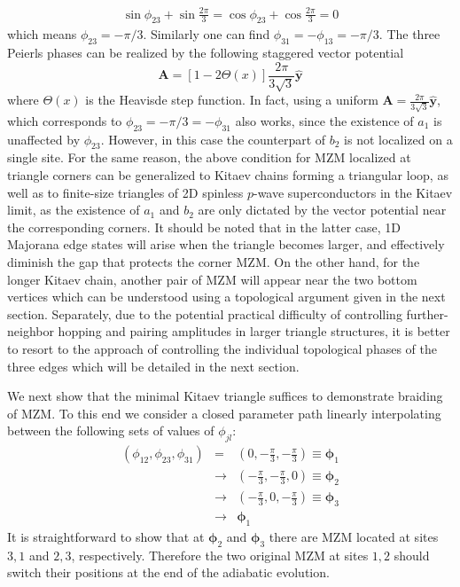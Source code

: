 \documentclass[aps,prb,twocolumn,showpacs,amsmath,amssymb,superscriptaddress]{revtex4-2}
\let\oldhat\hat
\renewcommand{\hat}[1]{\oldhat{\mathbf{#1}}}
\renewcommand{\vec}[1]{\mathbf{#1}}
\begin{document}
\begin{eqnarray}
    \sin\phi_{23} + \sin\frac{2\pi}{3} =\cos\phi_{23} + \cos\frac{2\pi}{3} = 0
\end{eqnarray}
which means $\phi_{23} = -\pi/3$. Similarly one can find $\phi_{31} =-\phi_{13} = -\pi/3$. The three Peierls phases can be realized by the following staggered vector potential
\begin{equation}\label{eq:Astep}
  \vec{A} =\left[1-2\Theta(x)\right]\frac{2 \pi}{3\sqrt{3}} \hat{y}
\end{equation}
where $\Theta(x)$ is the Heavisde step function. In fact, using a uniform $\vec{A} =\frac{2 \pi}{3\sqrt{3}} \hat{y}$, which corresponds to $\phi_{23} = -\pi/3 = -\phi_{31}$ also works, since the existence of $a_1$ is unaffected by $\phi_{23}$. However, in this case the counterpart of $b_2$ is not localized on a single site. For the same reason, the above condition for MZM localized at triangle corners can be generalized to Kitaev chains forming a triangular loop, as well as to finite-size triangles of 2D spinless $p$-wave superconductors in the Kitaev limit, as the existence of $a_1$ and $b_2$ are only dictated by the vector potential near the corresponding corners. It should be noted that in the latter case, 1D Majorana edge states will arise when the triangle becomes larger, and effectively diminish the gap that protects the corner MZM.  On the other hand, for the longer Kitaev chain, another pair of MZM will appear near the two bottom vertices which can be understood using a topological argument given in the next section. Separately, due to the potential practical difficulty of controlling further-neighbor hopping and pairing amplitudes in larger triangle structures, it is better to resort to the approach of controlling the individual topological phases of the three edges which will be detailed in the next section.

We next show that the minimal Kitaev triangle suffices to demonstrate braiding of MZM. To this end we consider a closed parameter path linearly interpolating between the following sets of values of $\phi_{jl}$:
\begin{eqnarray}
    (\phi_{12},\phi_{23},\phi_{31}) &=& \left(0,-\frac{\pi}{3},-\frac{\pi}{3}\right ) \equiv \bm \phi_1 \\\nonumber
    &\rightarrow& \left(-\frac{\pi}{3},-\frac{\pi}{3},0 \right) \equiv \bm \phi_2 \\\nonumber
    &\rightarrow& \left(-\frac{\pi}{3},0,-\frac{\pi}{3} \right) \equiv \bm \phi_3 \\\nonumber
    &\rightarrow& \bm \phi_1
\end{eqnarray}
It is straightforward to show that at $\bm \phi_{2}$ and $\bm \phi_3$ there are MZM located at sites $3,1$ and $2,3$, respectively. Therefore the two original MZM at sites $1,2$ should switch their positions at the end of the adiabatic evolution.
\end{document}
